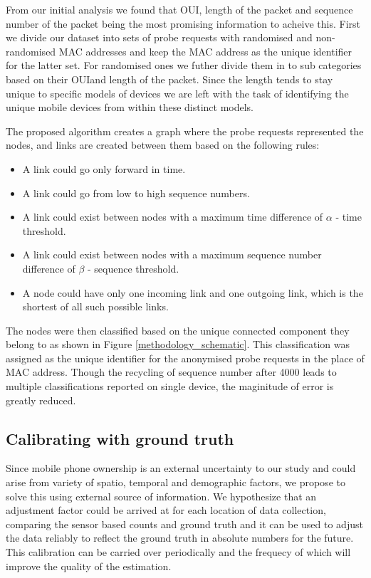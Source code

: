 From our initial analysis we found that OUI, length of the packet and sequence number of the packet being the most promising information to acheive this.
First we divide our dataset into sets of probe requests with randomised and non-randomised MAC addresses and keep the MAC address as the unique identifier for the latter set. 
For randomised ones we futher divide them in to sub categories based on their OUIand length of the packet.
Since the length tends to stay unique to specific models of devices we are left with the task of identifying the unique mobile devices from within these distinct models.

The proposed algorithm creates a graph where the probe requests represented the nodes, and links are created between them based on the following rules: 
\begin{itemize}
	\item A link could go only forward in time. 
	\item A link could go from low to high sequence numbers.
	\item A link could exist between nodes with a maximum time difference of $\alpha$ - time threshold.
	\item A link could exist between nodes with a maximum sequence number difference of $\beta$ - sequence threshold.
	\item A node could have only one incoming link and one outgoing link, which is the shortest of all such possible links.
\end{itemize}
The nodes were then classified based on the unique connected component they belong to as shown in Figure \ref{methodology_schematic}.
This classification was assigned as the unique identifier for the anonymised probe requests in the place of MAC address.
Though the recycling of sequence number after 4000 leads to multiple classifications reported on single device, the maginitude of error is greatly reduced. 

\subsection{Calibrating with ground truth}
Since mobile phone ownership is an external uncertainty to our study and could arise from variety of spatio, temporal and demographic factors, we propose to solve this using external source of information. We hypothesize that an adjustment factor could be arrived at for each location of data collection, comparing the sensor based counts and ground truth and it can be used to adjust the data reliably to reflect the ground truth in absolute numbers for the future. This calibration can be carried over periodically and the frequecy of which will improve the quality of the estimation.
